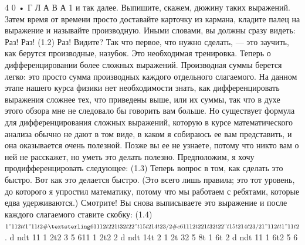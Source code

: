 \documentclass[10pt,oneside]{article}
\begin{document}
4 0 • Г Л А В А  1 и так далее. Выпишите, скажем, дюжину таких выражений. Затем время от времени просто доставайте карточку из кармана, кладите палец на выражение и называйте производную. Иными словами, вы должны сразу видеть: Раз! Раз! (1.2) Раз! Видите? Так что первое, что нужно сделать, --- это заучить, как берутся производные, назубок. Это необходимая тренировка. Теперь о дифференцировании более сложных выражений. Производная суммы берется легко: это просто сумма производных каждого отдельного слагаемого. На данном этапе нашего курса физики нет необходимости знать, как дифференцировать выражения сложнее тех, что приведены выше, или их суммы, так что в духе этого обзора мне не следовало бы говорить вам больше. Но существует формула для дифференцирования сложных выражений, которую в курсе математического анализа обычно не дают в том виде, в каком я собираюсь ее вам представить, и она оказывается очень полезной. Позже вы ее не узнаете, потому что никто вам о ней не расскажет, но уметь это делать полезно. Предположим, я хочу продифференцировать следующее: (1.3) Теперь вопрос в том, как сделать это быстро. Вот как это делается быстро. (Это всего лишь правила; это тот уровень, до которого я упростил математику, потому что мы работаем с ребятами, которые едва удерживаются.) Смотрите! Вы снова выписываете это выражение и после каждого слагаемого ставите скобку: (1.4) \(1 "1 1 2t t 1 "1 1 t 2 \# £ 611 1 2t 22 1t 3 2 t2 2 "t 1 5t 214t2 3/2 \# c 611 1 2t 22 1t 3 2 t2 2 "t 1 5t 214t2 3/2 1 "1 1 2t t 1 "1 1 t 2\). d ndt 11 1 2t2 3 5 611 1 2t2 2 d ndt 14t 2 1 2t 32 5 8t 1 6t 2 d ndt 11 1 6t2 5 6\par
\end{document}

